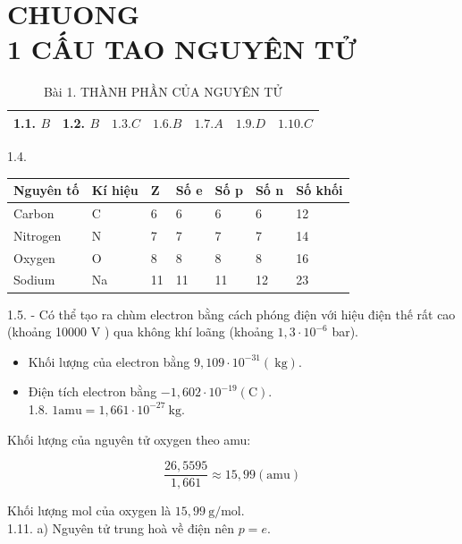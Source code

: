 \documentclass[10pt]{article}
\begin{document}
\captionsetup{singlelinecheck=false}
\section*{CHUONG \\
 1 CẤU TAO NGUYÊN TỬ}
\begin{table}[h]
\begin{center}
\captionsetup{labelformat=empty}
\caption{Bài 1. THÀNH PHẦN CỦA NGUYÊN TỬ}
\begin{tabular}{|l|l|l|l|l|l|l|}
\hline
1.1. $B$ & 1.2. $B$ & $1.3 . C$ & $1.6 . B$ & $1.7 . A$ & $1.9 . D$ & $1.10 . C$ \\
\hline
\end{tabular}
\end{center}
\end{table}

1.4.

\begin{center}
\begin{tabular}{|l|l|l|l|l|l|l|}
\hline
Nguyên tố & Kí hiệu & Z & Số e & Số p & Số n & Số khối \\
\hline
Carbon & C & 6 & 6 & 6 & 6 & 12 \\
\hline
Nitrogen & N & 7 & 7 & 7 & 7 & 14 \\
\hline
Oxygen & O & 8 & 8 & 8 & 8 & 16 \\
\hline
Sodium & Na & 11 & 11 & 11 & 12 & 23 \\
\hline
\end{tabular}
\end{center}

1.5. - Có thể tạo ra chùm electron bằng cách phóng điện với hiệu điện thế rất cao (khoảng 10000 V ) qua không khí loãng (khoảng $1,3 \cdot 10^{-6}$ bar).

\begin{itemize}
  \item Khối lượng của electron bằng $9,109 \cdot 10^{-31}(\mathrm{~kg})$.
  \item Điện tích electron bằng $-1,602 \cdot 10^{-19}(\mathrm{C})$.\\
1.8. $1 \mathrm{amu}=1,661 \cdot 10^{-27} \mathrm{~kg}$.
\end{itemize}

Khối lượng của nguyên tử oxygen theo amu:

$$
\frac{26,5595}{1,661} \approx 15,99(\mathrm{amu})
$$

Khối lượng mol của oxygen là $15,99 \mathrm{~g} / \mathrm{mol}$.\\
1.11. a) Nguyên tử trung hoà về điện nên $p=e$.
\end{document}
